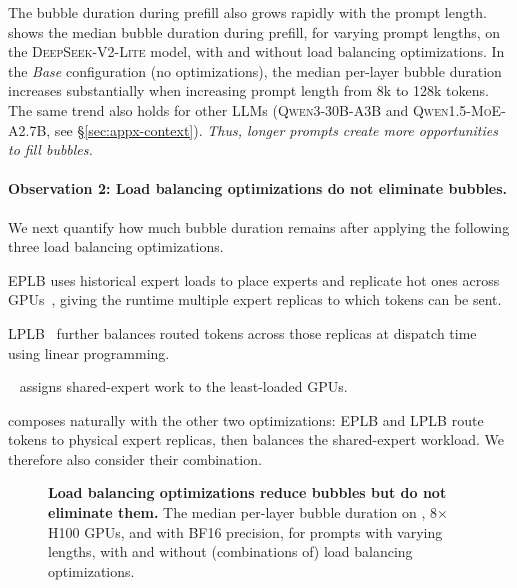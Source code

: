 The bubble duration during prefill also grows rapidly with the prompt length.
 shows the median bubble duration during prefill, for varying prompt lengths, on the \textsc{DeepSeek-V2-Lite} model, with and without load balancing optimizations.
In the \emph{Base} configuration (no optimizations), the median per-layer bubble duration increases substantially when increasing prompt length from 8k to 128k tokens.
The same trend also holds for other \acp{LLM} (\textsc{Qwen3-30B-A3B} and \textsc{Qwen1.5-MoE-A2.7B}, see \S\ref{sec:appx-context}).
\emph{Thus, longer prompts create more opportunities to fill bubbles.}

\paragraph{Observation 2: Load balancing optimizations do not eliminate bubbles.}
\label{sec:char-optimizations}

We next quantify how much bubble duration remains after applying the following three load balancing optimizations.
\begin{enumerate*}[label=(\roman*)]
    \item \Ac{EPLB} uses historical expert loads to place experts and replicate hot ones across GPUs~\cite{deepseekv3,eplb}, giving the runtime multiple expert replicas to which tokens can be sent.
    \item \ac{LPLB}~\cite{lplb} further balances routed tokens across those replicas at dispatch time using linear programming.
    \item \waterfill~\cite{waterfill} assigns shared-expert work to the least-loaded GPUs.
\end{enumerate*}
\waterfill composes naturally with the other two optimizations: \ac{EPLB} and \ac{LPLB} route tokens to physical expert replicas, then \waterfill balances the shared-expert workload.
We therefore also consider their combination.

\begin{figure}[t]
  \centering
  \caption{
    \textbf{Load balancing optimizations reduce bubbles but do not eliminate them.}
    The median per-layer bubble duration on \deepseekmoe, 8$\times$H100 GPUs, and with BF16 precision, for prompts with varying lengths, with and without (combinations of) load balancing optimizations.%
  }
  \label{fig:lb-sweep}
\end{figure}

